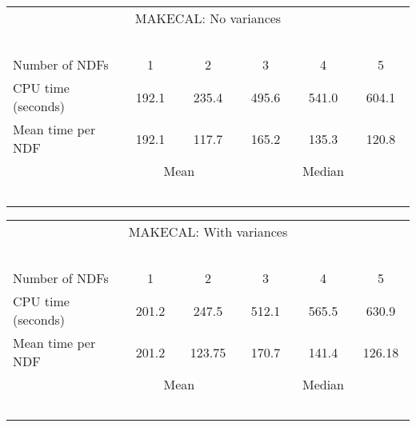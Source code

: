 \begin{center}
   \begin{tabular}{|l||c|c|c|c|c|}
   \multicolumn{6}{c}{MAKECAL: No variances} \\
   \multicolumn{6}{l}{~~~}
   \\ \hline
   Number of NDFs    & ~~~1~~~ & ~~~2~~~ & ~~~3~~~ & ~~~4~~~ & ~~~5~~~
    \\ \hline
   CPU time (seconds)&  192.1  & 235.4   & 495.6   & 541.0   & 604.1
    \\ \hline
   Mean time per NDF &  192.1  & 117.7   & 165.2   & 135.3   & 120.8
    \\ \hline
   \multicolumn{1}{c}{~~~}
   & \multicolumn{2}{c|}{Mean}
   & \multicolumn{3}{c}{Median}
   \\
   \multicolumn{6}{l}{~~~}
   \\
   \end{tabular}
   \begin{tabular}{|l||c|c|c|c|c|}
   \multicolumn{6}{c}{MAKECAL: With variances} \\
   \multicolumn{6}{l}{~~~}
   \\ \hline
   Number of NDFs    & ~~~1~~~ & ~~~2~~~ & ~~~3~~~ & ~~~4~~~ & ~~~5~~~
    \\ \hline
   CPU time (seconds)&  201.2  & 247.5   & 512.1   & 565.5   & 630.9
    \\ \hline
   Mean time per NDF &  201.2  & 123.75  & 170.7   & 141.4   & 126.18
    \\ \hline
   \multicolumn{1}{c}{~~~}
   & \multicolumn{2}{c|}{Mean}
   & \multicolumn{3}{c}{Median}
   \\
   \multicolumn{6}{l}{~~~}
   \\
   \end{tabular}
\end{center}

